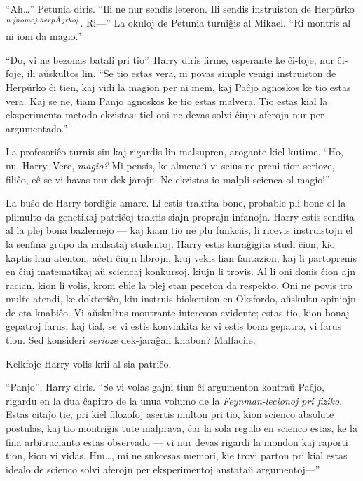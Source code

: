 ``Ah\ldots{}'' Petunia diris. ``Ili ne nur sendis leteron. Ili sendis
instruiston de Herpŭrko$^{\textit{n:\ref{nomoj:herpŭrko}}}$. Ri—'' La okuloj de Petunia
turniĝis al Mikael. ``Ri montris al ni iom da magio.''

``Do, vi ne bezonas batali pri tio''. Harry diris firme, esperante ke ĉi-foje,
nur ĉi-foje, ili aŭskultos lin. ``Se tio estas vera, ni povas simple venigi
instruiston de Herpŭrko ĉi tien, kaj vidi la magion per ni mem, kaj Paĉjo
agnoskos ke tio estas vera. Kaj se ne, tiam Panjo agnoskos ke tio estas malvera.
Tio estas kial la eksperimenta metodo ekzistas: tiel oni ne devas solvi ĉiujn
aferojn nur per argumentado.''

La profesoriĉo turnis sin kaj rigardis lin malsupren, arogante kiel kutime.
``Ho, nu, Harry. Vere, \emph{magio?} Mi pensis, ke almenaŭ vi scius ne preni
tion serioze, filiĉo, eĉ se vi havas nur dek jarojn. Ne ekzistas io malpli
scienca ol magio!''

La buŝo de Harry tordiĝis amare. Li estis traktita bone, probable pli bone ol la
plimulto da genetikaj patriĉoj traktis siajn proprajn infanojn. Harry estis
sendita al la plej bona bazlernejo — kaj kiam tio ne plu funkciis, li ricevis
instruistojn el la senfina grupo da malsataj studentoj. Harry estis kuraĝigita
studi ĉion, kio kaptis lian atenton, aĉeti ĉiujn librojn, kiuj vekis lian
fantazion, kaj li partoprenis en ĉiuj matematikaj aŭ sciencaj konkursoj, kiujn
li trovis. Al li oni donis ĉion ajn racian, kion li volis, krom eble la plej
etan peceton da respekto. Oni ne povis tro multe atendi, ke doktoriĉo, kiu
instruis biokemion en Oksfordo, aŭskultu opiniojn de eta knabiĉo. Vi aŭskultus
montrante intereson evidente; estas tio, kion bonaj gepatroj farus, kaj tial, se
vi estis konvinkita ke vi estis bona gepatro, vi farus tion. Sed konsideri
\emph{serioze} dek-jaraĝan knabon? Malfacile.

Kelkfoje Harry volis krii al sia patriĉo.

``Panjo'', Harry diris. ``Se vi volas gajni tiun ĉi argumenton kontraŭ Paĉjo,
rigardu en la dua ĉapitro de la unua volumo de la \textit{Feynman-lecionoj pri
  fiziko}. Estas citaĵo tie, pri kiel filozofoj asertis multon pri tio, kion
scienco absolute postulas, kaj tio montriĝis tute malprava, ĉar la sola regulo
en scienco estas, ke la fina arbitracianto estas observado — vi nur devas
rigardi la mondon kaj raporti tion, kion vi vidas. Hm\ldots{}, mi ne sukcesas
memori, kie trovi parton pri kial estas idealo de scienco solvi aferojn per
eksperimentoj anstataŭ argumentoj—''

